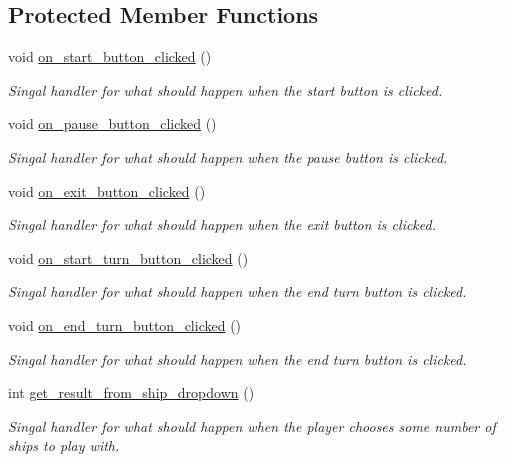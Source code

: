 \subsection*{Protected Member Functions}
\begin{DoxyCompactItemize}
\item 
void \mbox{\hyperlink{classMainMenu_a49ada5047a5c54593462bf05ccf93c49}{on\+\_\+start\+\_\+button\+\_\+clicked}} ()
\begin{DoxyCompactList}\small\item\em Singal handler for what should happen when the start button is clicked. \end{DoxyCompactList}\item 
void \mbox{\hyperlink{classMainMenu_a4c0bad31b1bbd49b3e8351ca137d4ac0}{on\+\_\+pause\+\_\+button\+\_\+clicked}} ()
\begin{DoxyCompactList}\small\item\em Singal handler for what should happen when the pause button is clicked. \end{DoxyCompactList}\item 
void \mbox{\hyperlink{classMainMenu_a9b9f6812f90946e135022cf5826d8eed}{on\+\_\+exit\+\_\+button\+\_\+clicked}} ()
\begin{DoxyCompactList}\small\item\em Singal handler for what should happen when the exit button is clicked. \end{DoxyCompactList}\item 
void \mbox{\hyperlink{classMainMenu_a2d91523fbe9c753f1de2ff429178b0d2}{on\+\_\+start\+\_\+turn\+\_\+button\+\_\+clicked}} ()
\begin{DoxyCompactList}\small\item\em Singal handler for what should happen when the end turn button is clicked. \end{DoxyCompactList}\item 
void \mbox{\hyperlink{classMainMenu_a08d40ee75aeed409f4ec19008e22fae2}{on\+\_\+end\+\_\+turn\+\_\+button\+\_\+clicked}} ()
\begin{DoxyCompactList}\small\item\em Singal handler for what should happen when the end turn button is clicked. \end{DoxyCompactList}\item 
int \mbox{\hyperlink{classMainMenu_ab155ec2f4fe3c5c26984118a23265ecb}{get\+\_\+result\+\_\+from\+\_\+ship\+\_\+dropdown}} ()
\begin{DoxyCompactList}\small\item\em Singal handler for what should happen when the player chooses some number of ships to play with. \end{DoxyCompactList}\end{DoxyCompactItemize}
